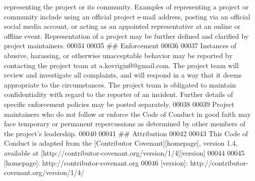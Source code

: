 \begin{DoxyCode}
       representing the project or its community. Examples of representing a project or community include using an
       official project e-mail address, posting via an official social media account, or acting as an appointed
       representative at an online or offline event. Representation of a project may be further defined and clarified by
       project maintainers.
00034 
00035 ## Enforcement
00036 
00037 Instances of abusive, harassing, or otherwise unacceptable behavior may be reported by contacting the
       project team at a.kovrigin0@gmail.com. The project team will review and investigate all complaints, and will
       respond in a way that it deems appropriate to the circumstances. The project team is obligated to maintain
       confidentiality with regard to the reporter of an incident. Further details of specific enforcement policies
       may be posted separately.
00038 
00039 Project maintainers who do not follow or enforce the Code of Conduct in good faith may face temporary
       or permanent repercussions as determined by other members of the project's leadership.
00040 
00041 ## Attribution
00042 
00043 This Code of Conduct is adapted from the [Contributor Covenant][homepage], version 1.4, available at
       [http://contributor-covenant.org/version/1/4][version]
00044 
00045 [homepage]: http://contributor-covenant.org
00046 [version]: http://contributor-covenant.org/version/1/4/
\end{DoxyCode}
